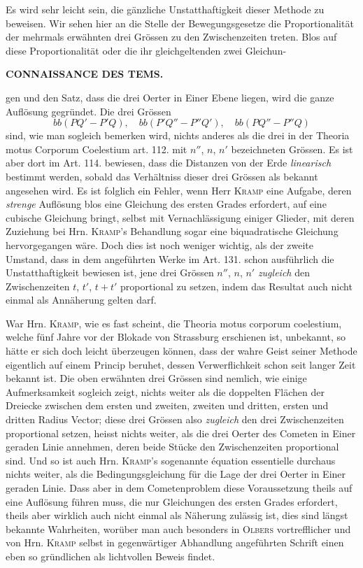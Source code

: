 Es wird sehr leicht sein, die gänzliche Unstatthaftigkeit dieser Methode zu beweisen. Wir sehen hier an
die Stelle der Bewegungsgesetze die Proportionalität der mehrmals erwähnten drei Grössen zu den
Zwischenzeiten treten. Blos auf diese Proportionalität oder die ihr gleichgeltenden zwei Gleichun-
\par
\clearpage
\thispagestyle{empty}
\noindent{}%
\makebox[12mm][l]{}%
\parbox[t]{\dimexpr\linewidth-24mm\relax}{\centering\footnotesize\bfseries CONNAISSANCE DES TEMS.}%
\par\nobreak\medskip
\noindent gen und den Satz, dass die drei Oerter in Einer Ebene liegen, wird die ganze Auflösung gegründet. Die
drei Grössen
\[
bb(PQ'-P'Q), \quad bb(P'Q''-P''Q'), \quad bb(PQ''-P''Q)
\]
sind, wie man sogleich bemerken wird, nichts anderes als die drei in der Theoria motus Corporum Coelestium
art. 112. mit $n''$, $n$, $n'$ bezeichneten Grössen. Es ist aber dort im Art. 114. bewiesen, dass die
Distanzen von der Erde \emph{linearisch} bestimmt werden, sobald das Verhältniss dieser drei Grössen als
bekannt angesehen wird. Es ist folglich ein Fehler, wenn Herr \textsc{Kramp} eine Aufgabe, deren \emph{strenge}
Auflösung blos eine Gleichung des ersten Grades erfordert, auf eine cubische Gleichung bringt, selbst mit
Vernachlässigung einiger Glieder, mit deren Zuziehung bei Hrn. \textsc{Kramp}'s Behandlung sogar eine
biquadratische Gleichung hervorgegangen wäre. Doch dies ist noch weniger wichtig, als der zweite Umstand,
dass in dem angeführten Werke im Art. 131. schon ausführlich die Unstatthaftigkeit bewiesen ist, jene
drei Grössen $n''$, $n$, $n'$ \emph{zugleich} den Zwischenzeiten $t$, $t'$, $t+t'$ proportional zu setzen,
indem das Resultat auch nicht einmal als Annäherung gelten darf.

War Hrn. \textsc{Kramp}, wie es fast scheint, die Theoria motus corporum coelestium, welche fünf Jahre vor
der Blokade von Strassburg erschienen ist, unbekannt, so hätte er sich doch leicht überzeugen können,
dass der wahre Geist seiner Methode eigentlich auf einem Princip beruhet, dessen Verwerflichkeit schon seit
langer Zeit bekannt ist. Die oben erwähnten drei Grössen sind nemlich, wie einige Aufmerksamkeit sogleich
zeigt, nichts weiter als die doppelten Flächen der Dreiecke zwischen dem ersten und zweiten, zweiten und
dritten, ersten und dritten Radius Vector; diese drei Grössen also \emph{zugleich} den drei Zwischenzeiten
proportional setzen, heisst nichts weiter, als die drei Oerter des Cometen in Einer geraden Linie annehmen,
deren beide Stücke den Zwischenzeiten proportional sind. Und so ist auch Hrn. \textsc{Kramp}'s sogenannte
équation essentielle durchaus nichts weiter, als die Bedingungsgleichung für die Lage der drei Oerter in
Einer geraden Linie. Dass aber in dem Cometenproblem diese Voraussetzung theils auf eine Auflösung führen
muss, die nur Gleichungen des ersten Grades erfordert, theils aber wirklich auch nicht einmal als Näherung
zulässig ist, dies sind längst bekannte Wahrheiten, worüber man auch besonders in \textsc{Olbers}
vortrefflicher und von Hrn. \textsc{Kramp} selbst in gegenwärtiger Abhandlung angeführten Schrift einen
eben so gründlichen als lichtvollen Beweis findet.
